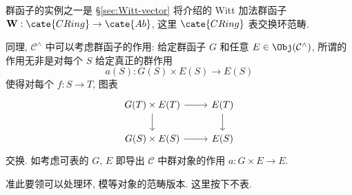 群函子的实例之一是 \S\ref{sec:Witt-vector} 将介绍的 Witt 加法群函子 $\mathbf{W}: \cate{CRing} \to \cate{Ab}$, 这里 $\cate{CRing}$ 表交换环范畴.

\begin{remark}
	同理, $\mathcal{C}^\wedge$ 中可以考虑群函子的作用: 给定群函子 $G$ 和任意 $E \in \Obj(\mathcal{C}^\wedge)$, 所谓的作用无非是对每个 $S$ 给定真正的群作用
	\[ a(S): G(S) \times E(S) \to E(S) \]
	使得对每个 $f: S \to T$, 图表
	\[ \begin{tikzcd}
		G(T) \times E(T) \arrow[d] \arrow[r] & E(T) \arrow[d] \\
		G(S) \times E(S) \arrow[r] & E(S)
	\end{tikzcd} \]
	交换. 如考虑可表的 $G$, $E$ 即导出 $\mathcal{C}$ 中群对象的作用 $a: G \times E \to E$.
\end{remark}
准此要领可以处理环, 模等对象的范畴版本. 这里按下不表.

